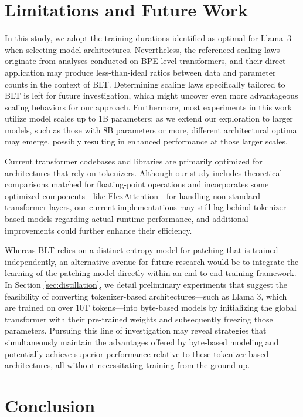 \section{Limitations and Future Work}

In this study, we adopt the training durations identified as optimal for Llama~3~\citep{dubey2024llama} when selecting model architectures. Nevertheless, the referenced scaling laws originate from analyses conducted on BPE-level transformers, and their direct application may produce less-than-ideal ratios between data and parameter counts in the context of {\textsc BLT}. Determining scaling laws specifically tailored to {\textsc BLT} is left for future investigation, which might uncover even more advantageous scaling behaviors for our approach. Furthermore, most experiments in this work utilize model scales up to 1B parameters; as we extend our exploration to larger models, such as those with 8B parameters or more, different architectural optima may emerge, possibly resulting in enhanced performance at those larger scales.

Current transformer codebases and libraries are primarily optimized for architectures that rely on tokenizers. Although our study includes theoretical comparisons matched for floating-point operations and incorporates some optimized components—like FlexAttention—for handling non-standard transformer layers, our current implementations may still lag behind tokenizer-based models regarding actual runtime performance, and additional improvements could further enhance their efficiency.

Whereas {\textsc BLT} relies on a distinct entropy model for patching that is trained independently, an alternative avenue for future research would be to integrate the learning of the patching model directly within an end-to-end training framework. In Section \ref{sec:distillation}, we detail preliminary experiments that suggest the feasibility of converting tokenizer-based architectures—such as Llama 3, which are trained on over 10T tokens—into byte-based models by initializing the global transformer with their pre-trained weights and subsequently freezing those parameters. Pursuing this line of investigation may reveal strategies that simultaneously maintain the advantages offered by byte-based modeling and potentially achieve superior performance relative to these tokenizer-based architectures, all without necessitating training from the ground up.

\section{Conclusion}
\label{section:conclusion}

